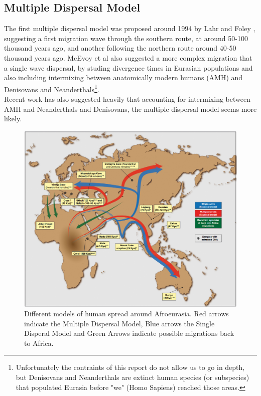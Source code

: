 \documentclass[11pt]{article}
\begin{document}
\begin{multicols}{2}
\subsection{Multiple Dispersal Model}
The first multiple dispersal model was proposed around 1994 by Lahr and Foley \cite{AAA}, suggesting a first migration wave through the southern route, at around 50-100 thousand years ago, and another following the northern route around 40-50 thousand years ago. McEvoy et al \cite{MCEV} also suggested a more complex migration that a single wave dispersal, by studing divergence times in Eurasian populations and also including intermixing between anatomically modern humans (AMH) and Denisovans and Neanderthals\footnote{Unfortunately the contraints of this report do not allow us to go in depth, but Denisovans and Neanderthals are extinct human species (or subspecies) that populated Eurasia before "we" (Homo Sapiens) reached those areas.}.\\
Recent work has also suggested heavily that accounting for intermixing between AMH and Neanderthals and Denisovans, the multiple dispersal model seems more likely\cite{TEMP}.
\end{multicols}

\begin{figure}[h!]
    \centering
    \includegraphics[scale=0.4]{Files/Images/migrationwaves.png}
    \caption{Different models of human spread around Afroeurasia. Red arrows indicate the Multiple Dispersal Model, Blue arrows the Single Disperal Model and Green Arrows indicate possible migrations back to Africa.}
\end{figure}
\end{document}
